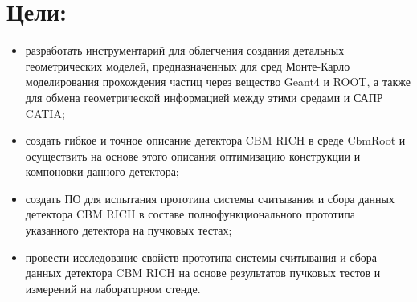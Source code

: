 \section*{Цели:}

\begin{itemize}
\item{разработать инструментарий для облегчения создания детальных геометрических моделей, предназначенных для сред Монте-Карло моделирования прохождения частиц через вещество Geant4 и ROOT, а также для обмена геометрической информацией между этими средами и САПР CATIA;}
\item{создать гибкое и точное описание детектора CBM RICH в среде CbmRoot и осуществить на основе этого описания оптимизацию конструкции и компоновки данного детектора;}
\item{создать ПО для испытания прототипа системы считывания и сбора данных детектора CBM RICH в составе полнофункционального прототипа указанного детектора на пучковых тестах;}
\item{провести исследование свойств прототипа системы считывания и сбора данных детектора CBM RICH на основе результатов пучковых тестов и измерений на лабораторном стенде.}
\end{itemize}
